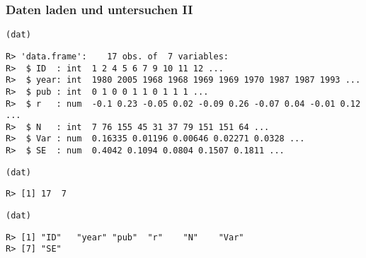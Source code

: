 \begin{frame}\frametitle{Daten laden und untersuchen II}
\begin{tiny}

\begin{knitrout}
\color{fgcolor}\begin{kframe}
\begin{alltt}
(dat)
\end{alltt}
\begin{verbatim}
R> 'data.frame':	17 obs. of  7 variables:
R>  $ ID  : int  1 2 4 5 6 7 9 10 11 12 ...
R>  $ year: int  1980 2005 1968 1968 1969 1969 1970 1987 1987 1993 ...
R>  $ pub : int  0 1 0 0 1 1 0 1 1 1 ...
R>  $ r   : num  -0.1 0.23 -0.05 0.02 -0.09 0.26 -0.07 0.04 -0.01 0.12 ...
R>  $ N   : int  7 76 155 45 31 37 79 151 151 64 ...
R>  $ Var : num  0.16335 0.01196 0.00646 0.02271 0.0328 ...
R>  $ SE  : num  0.4042 0.1094 0.0804 0.1507 0.1811 ...
\end{verbatim}
\begin{alltt}

(dat)
\end{alltt}
\begin{verbatim}
R> [1] 17  7
\end{verbatim}
\begin{alltt}

(dat)
\end{alltt}
\begin{verbatim}
R> [1] "ID"   "year" "pub"  "r"    "N"    "Var" 
R> [7] "SE"
\end{verbatim}
\end{kframe}
\end{knitrout}

\end{tiny}
\end{frame}


